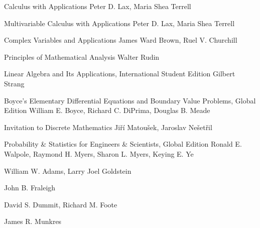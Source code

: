 
\rosbook
  {Calculus with Applications}
  {Peter D. Lax, Maria Shea Terrell}

\rosbook
  {Multivariable Calculus with Applications}
  {Peter D. Lax, Maria Shea Terrell}

\rosbook
  {Complex Variables and Applications}
  {James Ward Brown, Ruel V. Churchill}

\rosbook
  {Principles of Mathematical Analysis}
  {Walter Rudin}

\rosbook
  {Linear Algebra and Its Applications, International Student Edition}
  {Gilbert Strang}

\rosbook
  {Boyce's Elementary Differential Equations and Boundary Value Problems, Global Edition}
  {William E. Boyce, Richard C. DiPrima, Douglas B. Meade}

\rosbook
  {Invitation to Discrete Mathematics}
  {Jiří Matoušek, Jaroslav Nešetřil}

\rosbook
  {Probability \& Statistics for Engineers \& Scientists, Global Edition}
  {Ronald E. Walpole, Raymond H. Myers, Sharon L. Myers, Keying E. Ye}

  {William W. Adams, Larry Joel Goldstein}

  {John B. Fraleigh}

  {David S. Dummit, Richard M. Foote}

  {James R. Munkres}